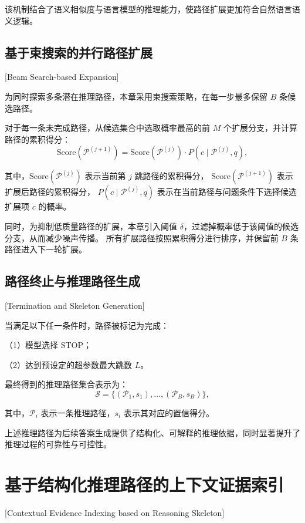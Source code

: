 该机制结合了语义相似度与语言模型的推理能力，使路径扩展更加符合自然语言语义逻辑。

\subsection{基于束搜索的并行路径扩展}[Beam Search-based Expansion]

为同时探索多条潜在推理路径，本章采用束搜索策略，在每一步最多保留 $B$ 条候选路径。

对于每一条未完成路径，从候选集合中选取概率最高的前 $M$ 个扩展分支，并计算路径的累积得分：
\begin{equation}
\text{Score}(\mathcal{P}^{(j+1)}) = \text{Score}(\mathcal{P}^{(j)}) \cdot P(c \mid \mathcal{P}^{(j)}, q),
\end{equation}

\noindent 其中，$\text{Score}(\mathcal{P}^{(j)})$ 表示当前第 $j$ 跳路径的累积得分，
$\text{Score}(\mathcal{P}^{(j+1)})$ 表示扩展后路径的累积得分，
$P(c \mid \mathcal{P}^{(j)}, q)$ 表示在当前路径与问题条件下选择候选扩展项 $c$ 的概率。

同时，为抑制低质量路径的扩展，本章引入阈值 $\delta$，过滤掉概率低于该阈值的候选分支，从而减少噪声传播。
所有扩展路径按照累积得分进行排序，并保留前 $B$ 条路径进入下一轮扩展。

\subsection{路径终止与推理路径生成}[Termination and Skeleton Generation]

当满足以下任一条件时，路径被标记为完成：

（1）模型选择 $\text{STOP}$；

（2）达到预设定的超参数最大跳数 $L$。

最终得到的推理路径集合表示为：
\begin{equation}
\mathcal{S} = \{ (\mathcal{P}_1, s_1), \dots, (\mathcal{P}_B, s_B) \},
\end{equation}

\noindent 其中，$\mathcal{P}_i$ 表示一条推理路径，$s_i$ 表示其对应的置信得分。

上述推理路径为后续答案生成提供了结构化、可解释的推理依据，同时显著提升了推理过程的可靠性与可控性。

\section{基于结构化推理路径的上下文证据索引}[Contextual Evidence Indexing based on Reasoning Skeleton]
